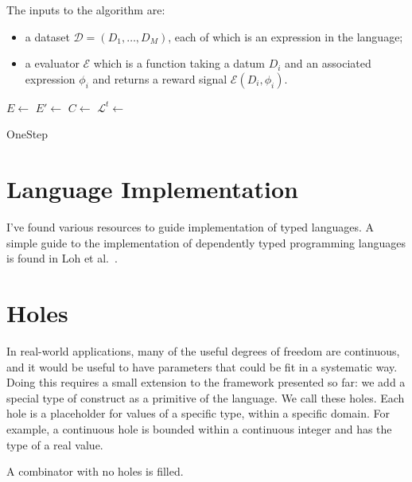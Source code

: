 \documentclass{article}
\begin{document}
The inputs to the algorithm are:
\begin{itemize}
\item a dataset $\mathcal{D} = (D_1, \dots, D_M)$, each of which is an
  expression in the language;
\item a evaluator $\mathcal{E}$ which is a function taking a datum
  $D_i$ and an associated expression $\phi_i$ and returns a reward
  signal $\mathcal{E}(D_i, \phi_i)$.
\end{itemize}

\begin{minipage}{.7\linewidth}
  \begin{algorithm}[H]
    \SetAlgoLined 
    $E \leftarrow $ \;
    $E' \leftarrow $ 
      \;
    $C \leftarrow$ \;
    $\mathcal{L}^t \leftarrow$ \;
    \caption{OneStep}
  \end{algorithm}
\end{minipage}


\section{Language Implementation}
I've found various resources to guide implementation of typed
languages.  A simple guide to the implementation of dependently typed
programming languages is found in Loh et al.~\cite{lowsimply}.

\section{Holes}
In real-world applications, many of the useful degrees of freedom are
continuous, and it would be useful to have parameters that could be
fit in a systematic way. Doing this requires a small extension to the
framework presented so far: we add a special type of construct as a
primitive of the language. We call these holes. Each hole is a
placeholder for values of a specific type, within a specific
domain. For example, a continuous hole is bounded within a continuous
integer and has the type of a real value.

A combinator with no holes is filled.









\end{document}
